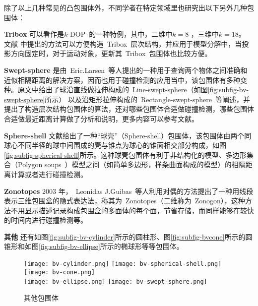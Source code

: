 除了以上几种常见的凸包围体外，不同学者在特定领域里也研究出以下另外几种包围体：\\
\begin{inparaenum}[(1)]
\indent
\item \textbf{Tribox} 可以看作是$k$-DOP~的一种特例，其中，二维中$k=8$ ，三维中$k=18$。 文献 中提出的方法可以方便构造~Tribox~层次结构，并应用于模型分解中，当投影方向固定时，对于运动对象，更新其~Tribox~包围体也比较方便。 \\ 
\indent
\item \textbf{Swept-sphere}
是由~Eric.Larsen~等人\cite{Larsen1999Fast}提出的一种用于查询两个物体之间准确和近似相隔距离的解决方案，因而也用于碰撞检测的应用当中，该包围体有多种变种。原文中给出了球沿直线做拉伸构成的~Line-swept-sphere（如图\ref{fig:subfig-bv-swept-sphere}所示）
以及沿矩形拉伸构成的~Rectangle-swept-sphere~等阐述，并提出了构造层次结构包围体的算法，还对哪些包围体合适做碰撞检测，哪些包围体合适做最近距离计算做了分析和说明，更多内容可以参考文献。\\
\indent
\item \textbf{Sphere-shell}
文献给出了一种“球壳”（Sphere-shell）包围体，该包围体由两个同球心不同半径的球中间围成的壳与锥点为球心的锥面相交部分构成，如图\ref{fig:subfig-spherical-shell}所示。这种球壳包围体有利于非结构化的模型、多边形集合（Polygon
soups~）模型之间（如简单多边形，样条曲面构成的模型）的相隔距离计算或者进行碰撞检测。\\
\indent
\item \textbf{Zonotopes} 2003 年，~Leonidas
J.Guibas~\cite{Guibas2003Zonotopes}等人利用对偶的方法提出了一种用线段表示三维包围盒的隐式表达法，称其为~Zonotopes（二维称为~Zonogon），这种方法不用显示描述记录构成包围盒的多面体的每个面，节省存储，而同样能够在较快的时间内进行碰撞检测等。\\
\indent
\item \textbf{其他}
还有如图\ref{fig:subfig-bv-cylinder}所示的圆柱形\cite{Schomer2000Smallest}、图\ref{fig:subfig-bvcone}所示的圆锥形\cite{held1997erit}和如图\ref{fig:subfig-bv-ellipse}所示的椭球形\cite{Wang2004Efficient}等等包围体。
\end{inparaenum}

\begin{figure}[htbp]
  \centering%
    {\texttt{[image: bv-cylinder.png]}}
    {\texttt{[image: bv-spherical-shell.png]}}
    {\texttt{[image: bv-cone.png]}}
  \\
    {\texttt{[image: bv-ellipse.png]}}
    {\texttt{[image: bv-swept-sphere.png]}}
  \caption{其他包围体}
  \label{fig:bv-others}
\end{figure}

